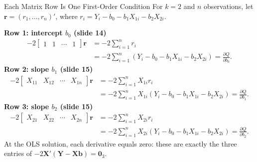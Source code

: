 \documentclass[notes,10pt, aspectratio=169]{beamer}
\begin{document}
\begin{frame}{Each Matrix Row Is One First-Order Condition}
\footnotesize
\setlength{\abovedisplayskip}{2pt}
\setlength{\belowdisplayskip}{2pt}
\setlength{\jot}{0pt}
For $k=2$ and $n$ observations, let $\bm{r}=(r_1,\ldots,r_n)'$, where
$r_i=Y_i-b_0-b_1X_{1i}-b_2X_{2i}$.

\textbf{Row 1: intercept $b_0$ (slide 14)}
\[
\begin{aligned}
-2\begin{bmatrix}1&1&\cdots&1\end{bmatrix}\bm{r}
&=-2\sum_{i=1}^{n}r_i\\
&=-2\sum_{i=1}^{n}(Y_i-b_0-b_1X_{1i}-b_2X_{2i})=\frac{\partial Q}{\partial b_0}.
\end{aligned}
\]
\textbf{Row 2: slope $b_1$ (slide 15)}
\[
\begin{aligned}
-2\begin{bmatrix}X_{11}&X_{12}&\cdots&X_{1n}\end{bmatrix}\bm{r}
&=-2\sum_{i=1}^{n}X_{1i}r_i\\
&=-2\sum_{i=1}^{n}X_{1i}(Y_i-b_0-b_1X_{1i}-b_2X_{2i})=\frac{\partial Q}{\partial b_1}.
\end{aligned}
\]
\textbf{Row 3: slope $b_2$ (slide 15)}
\[
\begin{aligned}
-2\begin{bmatrix}X_{21}&X_{22}&\cdots&X_{2n}\end{bmatrix}\bm{r}
&=-2\sum_{i=1}^{n}X_{2i}r_i\\
&=-2\sum_{i=1}^{n}X_{2i}(Y_i-b_0-b_1X_{1i}-b_2X_{2i})=\frac{\partial Q}{\partial b_2}.
\end{aligned}
\]
At the OLS solution, each derivative equals zero: these are exactly the three entries of
$-2\bm{X}'(\bm{Y}-\bm{Xb})=\bm{0}_3$.
\end{frame}
\end{document}
